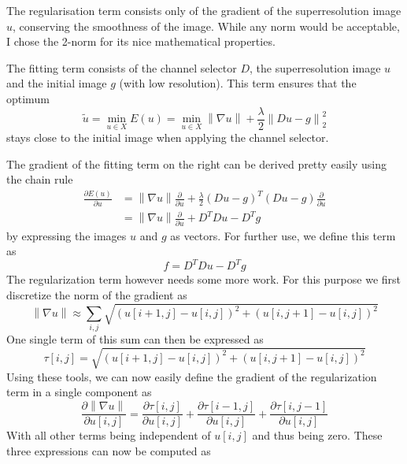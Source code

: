\documentclass{paper}
\newcommand{\norm}[1]{\left\lVert#1\right\rVert}
\begin{document}
The regularisation term consists only of the gradient
of the superresolution image $u$, conserving the smoothness of the image.
While any norm would be acceptable, I chose the 2-norm for its nice
mathematical properties.

The fitting term consists of the channel selector $D$, 
the superresolution image $u$ and the initial image $g$ (with low resolution).
This term ensures that the optimum
\begin{equation}
\tilde{u} = \min_{u \in X} E(u) = \min_{u \in X} \norm{\nabla u} + \frac{\lambda}{2} \norm{Du - g}^2_2
\end{equation}
stays close to the initial
image when applying the channel selector. 

The gradient of the fitting term on the right can be derived pretty easily using the chain rule
\begin{align}
\frac{\partial E(u)}{\partial u} 
&= \norm{\nabla u}\frac{\partial}{\partial u} + 
\frac{\lambda}{2} (Du - g)^T(Du - g) \frac{\partial}{\partial u} \\
&= \norm{\nabla u} \frac{\partial}{\partial u} + D^T D u - D^T g
\end{align}
by expressing the images $u$ and $g$ as vectors. For further use, we define
this term as 
\begin{equation}
 f = D^T D u - D^T g
\end{equation}
The regularization term however needs some more work. 
For this purpose we first discretize the norm of the gradient as
\begin{equation}
\norm{\nabla u} \approx \sum_{i,j} 
	\sqrt{(u[i+1,j] - u[i,j])^2 + (u[i, j+1] - u[i, j])^2}
\end{equation}
One single term of this sum can then be expressed as
\begin{equation}
\tau[i,j] = \sqrt{(u[i+1,j] - u[i,j])^2 + (u[i, j+1] - u[i, j])^2}
\end{equation}
Using these tools, we can now easily define the gradient of the regularization term in a single component as
\begin{equation}
\frac{\partial \norm{\nabla u}}{\partial u[i,j]} = 
	\frac{\partial \tau[i,j]}{\partial u[i,j]} +
	\frac{\partial \tau[i - 1,j]}{\partial u[i,j]} +
	\frac{\partial \tau[i,j - 1]}{\partial u[i,j]}
\end{equation}
With all other terms being independent of $u[i,j]$ and thus being zero.
These three expressions can now be computed as
\end{document}
